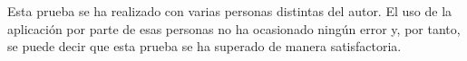 Esta prueba se ha realizado con varias personas distintas del autor. El uso de la aplicación por parte de esas personas no ha ocasionado ningún error y, por tanto, se puede decir que esta prueba se ha superado de manera satisfactoria.
	
	
	
	
	
	
	
	
	
	
	
	
	
	
	
	
	
	
	
	
	
	
	
	
	
	
	
	
	
	
	
	